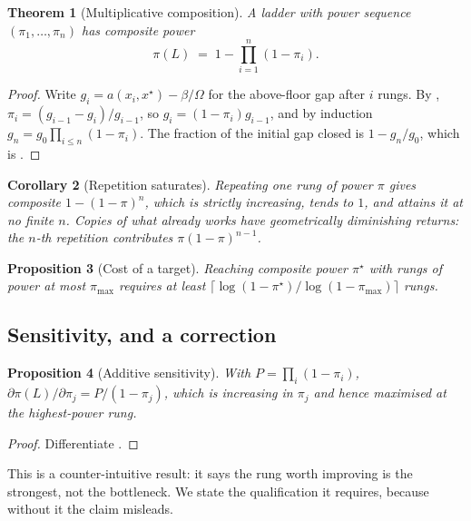 \documentclass[11pt,twocolumn,a4paper]{article}
\theoremstyle{thmstyle}
\newtheorem{theorem}{Theorem}[section]
\newtheorem{proposition}[theorem]{Proposition}
\newtheorem{corollary}[theorem]{Corollary}
\theoremstyle{definition}
\theoremstyle{remark}
\newcommand{\flo}{\beta}
\newcommand{\pow}{\pi}
\newcommand{\Lad}{L}
\newcommand{\Tot}{\Omega}
\begin{document}
\begin{theorem}[Multiplicative composition]
\label{thm:compose}
A ladder with power sequence $(\pow_1,\dots,\pow_n)$ has composite power
\begin{equation}
\pow(\Lad) \;=\; 1-\prod_{i=1}^{n}(1-\pow_i).
\label{eq:compose}
\end{equation}
\end{theorem}

\begin{proof}
Write $g_i = a(x_i,x^\star)-\flo/\Tot$ for the above-floor gap after $i$
rungs. By , $\pow_i=(g_{i-1}-g_i)/g_{i-1}$, so
$g_i=(1-\pow_i)g_{i-1}$, and by induction
$g_n = g_0\prod_{i\leq n}(1-\pow_i)$. The fraction of the initial gap closed
is $1-g_n/g_0$, which is .
\end{proof}

\begin{corollary}[Repetition saturates]
\label{cor:saturate}
Repeating one rung of power $\pow$ gives composite $1-(1-\pow)^n$, which is
strictly increasing, tends to $1$, and attains it at no finite $n$. Copies of
what already works have geometrically diminishing returns: the $n$-th
repetition contributes $\pow(1-\pow)^{n-1}$.
\end{corollary}

\begin{proposition}[Cost of a target]
\label{prop:cost}
Reaching composite power $\pow^\star$ with rungs of power at most $\pow_{\max}$
requires at least
$\lceil \log(1-\pow^\star)/\log(1-\pow_{\max}) \rceil$ rungs.
\end{proposition}

\subsection{Sensitivity, and a correction}
\label{sec:sensitivity}

\begin{proposition}[Additive sensitivity]
\label{prop:additive}
With $P=\prod_i(1-\pow_i)$,
$\partial\pow(\Lad)/\partial\pow_j = P/(1-\pow_j)$, which is increasing in
$\pow_j$ and hence maximised at the \emph{highest}-power rung.
\end{proposition}

\begin{proof}
Differentiate .
\end{proof}

This is a counter-intuitive result: it says the rung worth improving is the
strongest, not the bottleneck. We state the qualification it requires, because
without it the claim misleads.
\end{document}
